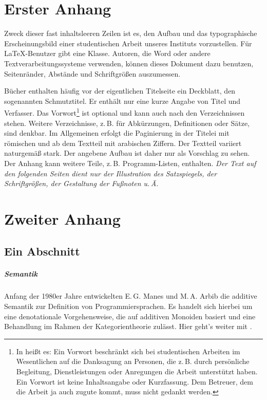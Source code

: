 \chapter{Erster Anhang}

Zweck dieser fast inhaltsleeren Zeilen ist es, den Aufbau und das
typographische Erscheinungsbild einer studentischen Arbeit unseres
Instituts vorzustellen. Für \LaTeX-Benutzer gibt eine Klasse.
Autoren, die \glqq{}Word\grqq{} oder andere Textverarbeitungssysteme
verwenden, können dieses Dokument \zB dazu benutzen, Seitenränder,
Abstände und Schriftgrößen auszumessen.

Bücher enthalten häufig vor der eigentlichen Titelseite ein Deckblatt,
den sogenannten Schmutztitel. Er enthält nur eine kurze Angabe von Titel
und Verfasser. Das Vorwort\footnote{In \cite{lit01} heißt es: \glqq{}Ein
Vorwort beschränkt sich bei studentischen Arbeiten im Wesentlichen auf
die Danksagung an Personen, die z.\,B. durch persönliche Begleitung,
Dienstleistungen oder Anregungen die Arbeit unterstützt haben. Ein Vorwort
ist keine Inhaltsangabe oder Kurzfassung. Dem Betreuer, dem die Arbeit ja
auch zugute kommt, muss nicht gedankt werden.\grqq} ist optional und kann
auch nach den Verzeichnissen stehen. Weitere Verzeichnisse, z.\,B. für
Abkürzungen, Definitionen oder Sätze, sind denkbar. Im Allgemeinen
erfolgt die Paginierung in der Titelei mit römischen und ab
dem Textteil mit arabischen Ziffern. Der Textteil variiert naturgemäß
stark. Der angebene Aufbau ist daher nur als Vorschlag zu sehen. Der
Anhang kann weitere Teile, z.\,B. Programm-Listen, enthalten.
\emph{Der Text auf den folgenden Seiten dient nur der Illustration
des Satzspiegels, der Schriftgrößen, der Gestaltung der Fußnoten u.\,Ä.}

\chapter{Zweiter Anhang}

\section{Ein Abschnitt}

\paragraph{Semantik}

Anfang der 1980er Jahre entwickelten E.\,G. Manes und M.\,A. Arbib die
additive Semantik zur Definition von Programmiersprachen. Es handelt
sich hierbei um eine denotationale Vorgehensweise, die auf additiven
Monoiden basiert und eine Behandlung im Rahmen der
Kategorientheorie zulässt. Hier geht's weiter mit \cite{lit01}.

